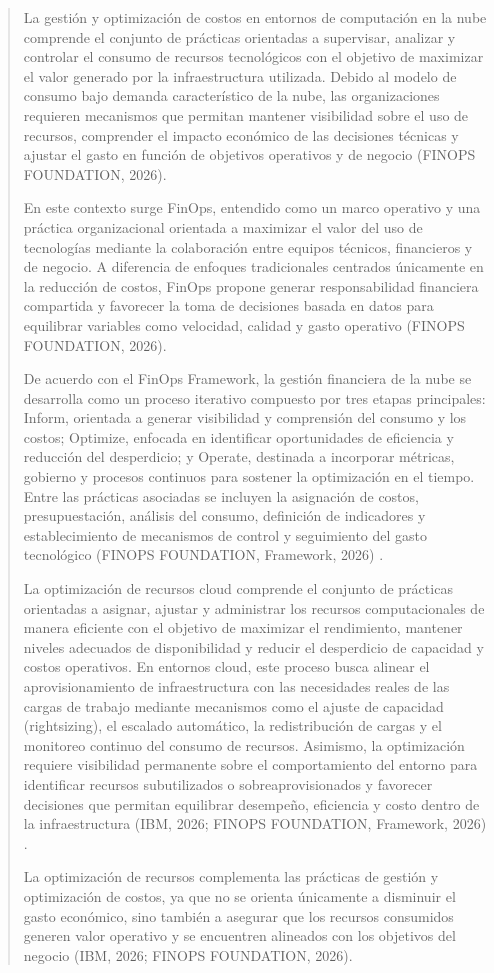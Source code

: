 \documentclass[
]{article}
\begin{document}
\begin{quote}
La gestión y optimización de costos en entornos de computación en la
nube comprende el conjunto de prácticas orientadas a supervisar,
analizar y controlar el consumo de recursos tecnológicos con el objetivo
de maximizar el valor generado por la infraestructura utilizada. Debido
al modelo de consumo bajo demanda característico de la nube, las
organizaciones requieren mecanismos que permitan mantener visibilidad
sobre el uso de recursos, comprender el impacto económico de las
decisiones técnicas y ajustar el gasto en función de objetivos
operativos y de negocio (FINOPS FOUNDATION, 2026).

En este contexto surge FinOps, entendido como un marco operativo y una
práctica organizacional orientada a maximizar el valor del uso de
tecnologías mediante la colaboración entre equipos técnicos, financieros
y de negocio. A diferencia de enfoques tradicionales centrados
únicamente en la reducción de costos, FinOps propone generar
responsabilidad financiera compartida y favorecer la toma de decisiones
basada en datos para equilibrar variables como velocidad, calidad y
gasto operativo (FINOPS FOUNDATION, 2026).

De acuerdo con el FinOps Framework, la gestión financiera de la nube se
desarrolla como un proceso iterativo compuesto por tres etapas
principales: Inform, orientada a generar visibilidad y comprensión del
consumo y los costos; Optimize, enfocada en identificar oportunidades de
eficiencia y reducción del desperdicio; y Operate, destinada a
incorporar métricas, gobierno y procesos continuos para sostener la
optimización en el tiempo. Entre las prácticas asociadas se incluyen la
asignación de costos, presupuestación, análisis del consumo, definición
de indicadores y establecimiento de mecanismos de control y seguimiento
del gasto tecnológico (FINOPS FOUNDATION, Framework, 2026) .

La optimización de recursos cloud comprende el conjunto de prácticas
orientadas a asignar, ajustar y administrar los recursos computacionales
de manera eficiente con el objetivo de maximizar el rendimiento,
mantener niveles adecuados de disponibilidad y reducir el desperdicio de
capacidad y costos operativos. En entornos cloud, este proceso busca
alinear el aprovisionamiento de infraestructura con las necesidades
reales de las cargas de trabajo mediante mecanismos como el ajuste de
capacidad (rightsizing), el escalado automático, la redistribución de
cargas y el monitoreo continuo del consumo de recursos. Asimismo, la
optimización requiere visibilidad permanente sobre el comportamiento del
entorno para identificar recursos subutilizados o sobreaprovisionados y
favorecer decisiones que permitan equilibrar desempeño, eficiencia y
costo dentro de la infraestructura (IBM, 2026; FINOPS FOUNDATION,
Framework, 2026) .

La optimización de recursos complementa las prácticas de gestión y
optimización de costos, ya que no se orienta únicamente a disminuir el
gasto económico, sino también a asegurar que los recursos consumidos
generen valor operativo y se encuentren alineados con los objetivos del
negocio (IBM, 2026; FINOPS FOUNDATION, 2026).
\end{quote}
\end{document}
